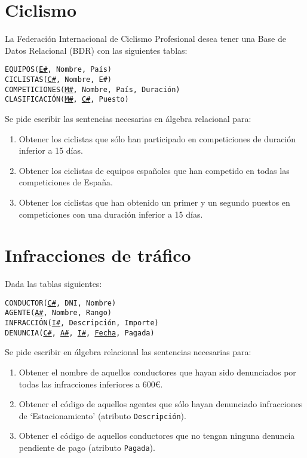 \documentclass{db-practice}
\begin{document}
\section{Ciclismo}

La Federación Internacional de Ciclismo Profesional desea tener una Base de Datos Relacional (BDR) con las siguientes tablas:

\begin{addmargin}[1.5em]{0em}
    \texttt{EQUIPOS(\underline{E\#}, Nombre, País)}\\
    \texttt{CICLISTAS(\underline{C\#}, Nombre, E\#)}\\
    \texttt{COMPETICIONES(\underline{M\#}, Nombre, País, Duración)}\\
    \texttt{CLASIFICACIÓN(\underline{M\#}, \underline{C\#}, Puesto)}
\end{addmargin}

Se pide escribir las sentencias necesarias en álgebra relacional para:

\begin{enumerate}
    \item Obtener los ciclistas que sólo han participado en competiciones de duración inferior a 15 días.
    \item Obtener los ciclistas de equipos españoles que han competido en todas las competiciones de España.
    \item Obtener los ciclistas que han obtenido un primer y un segundo puestos en competiciones con una duración inferior a 15 días.
\end{enumerate}

\section{Infracciones de tráfico}

Dada las tablas siguientes:

\begin{addmargin}[1.5em]{0em}
    \texttt{CONDUCTOR(\underline{C\#}, DNI, Nombre)}\\
    \texttt{AGENTE(\underline{A\#}, Nombre, Rango)}\\
    \texttt{INFRACCIÓN(\underline{I\#}, Descripción, Importe)}\\
    \texttt{DENUNCIA(\underline{C\#}, \underline{A\#}, \underline{I\#}, \underline{Fecha}, Pagada)}
\end{addmargin}

Se pide escribir en álgebra relacional las sentencias necesarias para:

\begin{enumerate}
    \item Obtener el nombre de aquellos conductores que hayan sido denunciados por todas las infracciones inferiores a 600€.
    \item Obtener el código de aquellos agentes que sólo hayan denunciado infracciones de `Estacionamiento' (atributo \texttt{Descripción}).
    \item Obtener el código de aquellos conductores que no tengan ninguna denuncia pendiente de pago (atributo \texttt{Pagada}).
\end{enumerate}
\end{document}
